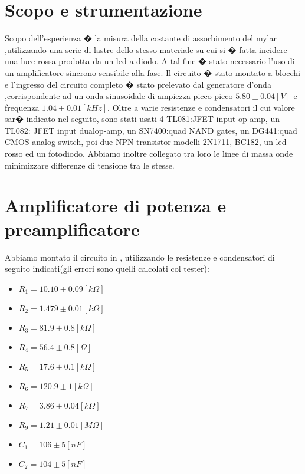 \section{Scopo e strumentazione}
Scopo dell'esperienza � la misura della costante di assorbimento del mylar ,utilizzando una serie di lastre dello stesso materiale su cui si � fatta incidere una luce rossa prodotta da un led a diodo. A tal fine � stato necessario l'uso di un amplificatore sincrono sensibile alla fase.
Il circuito � stato montato a blocchi e l'ingresso del circuito completo � stato prelevato dal generatore d'onda ,corrispondente ad un onda sinusoidale di ampiezza picco-picco $5.80 \pm 0.04 [V]$ e frequenza $1.04 \pm 0.01 [kHz]$.
Oltre a varie resistenze e condensatori il cui valore sar� indicato nel seguito, sono stati usati 4 TL081:JFET input op-amp, un TL082: JFET input dualop-amp, un SN7400:quad NAND gates, un DG441:quad CMOS analog switch, poi due NPN transistor modelli 2N1711, BC182, un led rosso ed un fotodiodo.
Abbiamo inoltre collegato tra loro le linee di massa onde minimizzare differenze di tensione tra le stesse.

\section{Amplificatore di potenza e preamplificatore}
Abbiamo montato il circuito in , utilizzando le resistenze e condensatori di seguito indicati(gli errori sono quelli calcolati col tester):
\begin{itemize}
\item $R_1=10.10 \pm 0.09[k\Omega]$
\item $R_2=1.479 \pm 0.01[k\Omega]$
\item $R_3=81.9 \pm 0.8[k\Omega]$
\item $R_4=56.4 \pm 0.8[\Omega]$
\item $R_5=17.6 \pm 0.1[k\Omega]$
\item $R_6=120.9 \pm 1[k\Omega]$
\item $R_7=3.86 \pm 0.04[k\Omega]$
\item $R_9=1.21 \pm 0.01[M\Omega]$
\item $C_1=106 \pm 5[nF]$
\item $C_2=104 \pm 5[nF]$
\end{itemize}


